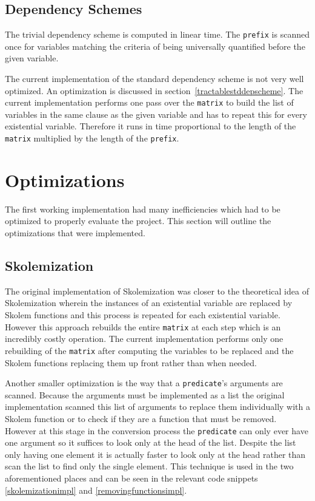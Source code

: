 \subsection{Dependency Schemes} \label{depschemecomplexity}
The trivial dependency scheme is computed in linear time. The \texttt{prefix} is scanned once for variables matching the criteria of being universally quantified before the given variable.

The current implementation of the standard dependency scheme is not very well optimized. An optimization is discussed in section~\ref{tractablestddepscheme}. The current implementation performs one pass over the \texttt{matrix} to build the list of variables in the same clause as the given variable and has to repeat this for every existential variable. Therefore it runs in time proportional to the length of the \texttt{matrix} multiplied by the length of the \texttt{prefix}.

\section{Optimizations} \label{optimizations}
The first working implementation had many inefficiencies which had to be optimized to properly evaluate the project. This section will outline the optimizations that were implemented.

\subsection{Skolemization}
The original implementation of Skolemization was closer to the theoretical idea of Skolemization wherein the instances of an existential variable are replaced by Skolem functions and this process is repeated for each existential variable. However this approach rebuilds the entire \texttt{matrix} at each step which is an incredibly costly operation. The current implementation performs only one rebuilding of the \texttt{matrix} after computing the variables to be replaced and the Skolem functions replacing them up front rather than when needed.

Another smaller optimization is the way that a \texttt{predicate}'s arguments are scanned. Because the arguments must be implemented as a list the original implementation scanned this list of arguments to replace them individually with a Skolem function or to check if they are a function that must be removed. However at this stage in the conversion process the \texttt{predicate} can only ever have one argument so it suffices to look only at the head of the list. Despite the list only having one element it is actually faster to look only at the head rather than scan the list to find only the single element. This technique is used in the two aforementioned places and can be seen in the relevant code snippets \ref{skolemizationimpl} and \ref{removingfunctionsimpl}.


